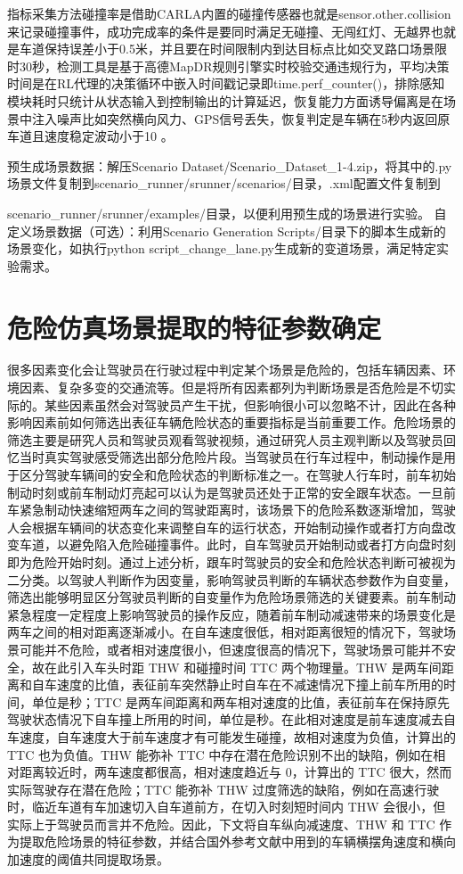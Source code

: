 指标采集方法碰撞率是借助CARLA内置的碰撞传感器也就是sensor.other.collision来记录碰撞事件，成功完成率的条件是要同时满足无碰撞、无闯红灯、无越界也就是车道保持误差小于0.5米，并且要在时间限制内到达目标点比如交叉路口场景限时30秒，检测工具是基于高德MapDR规则引擎实时校验交通违规行为，平均决策时间是在RL代理的决策循环中嵌入时间戳记录即time.perf\_counter()，排除感知模块耗时只统计从状态输入到控制输出的计算延迟，恢复能力方面诱导偏离是在场景中注入噪声比如突然横向风力、GPS信号丢失，恢复判定是车辆在5秒内返回原车道且速度稳定波动小于10 。

预生成场景数据：解压Scenario Dataset/Scenario\_Dataset\_1-4.zip，将其中的.py场景文件复制到scenario\_runner/srunner/scenarios/目录，.xml配置文件复制到

scenario\_runner/srunner/examples/目录，以便利用预生成的场景进行实验。
自定义场景数据（可选）：利用Scenario Generation Scripts/目录下的脚本生成新的场景变化，如执行python script\_change\_lane.py生成新的变道场景，满足特定实验需求。

\section{危险仿真场景提取的特征参数确定}

很多因素变化会让驾驶员在行驶过程中判定某个场景是危险的，包括车辆因素、环境因素、复杂多变的交通流等。但是将所有因素都列为判断场景是否危险是不切实际的。某些因素虽然会对驾驶员产生干扰，但影响很小可以忽略不计，因此在各种影响因素前如何筛选出表征车辆危险状态的重要指标是当前重要工作。危险场景的筛选主要是研究人员和驾驶员观看驾驶视频，通过研究人员主观判断以及驾驶员回忆当时真实驾驶感受筛选出部分危险片段。当驾驶员在行车过程中，制动操作是用于区分驾驶车辆间的安全和危险状态的判断标准之一。在驾驶人行车时，前车初始制动时刻或前车制动灯亮起可以认为是驾驶员还处于正常的安全跟车状态。一旦前车紧急制动快速缩短两车之间的驾驶距离时，该场景下的危险系数逐渐增加，驾驶人会根据车辆间的状态变化来调整自车的运行状态，开始制动操作或者打方向盘改变车道，以避免陷入危险碰撞事件。此时，自车驾驶员开始制动或者打方向盘时刻即为危险开始时刻。通过上述分析，跟车时驾驶员的安全和危险状态判断可被视为二分类。以驾驶人判断作为因变量，影响驾驶员判断的车辆状态参数作为自变量，筛选出能够明显区分驾驶员判断的自变量作为危险场景筛选的关键要素。前车制动紧急程度一定程度上影响驾驶员的操作反应，随着前车制动减速带来的场景变化是两车之间的相对距离逐渐减小。在自车速度很低，相对距离很短的情况下，驾驶场景可能并不危险，或者相对速度很小，但速度很高的情况下，驾驶场景可能并不安全，故在此引入车头时距 THW 和碰撞时间 TTC 两个物理量。THW 是两车间距离和自车速度的比值，表征前车突然静止时自车在不减速情况下撞上前车所用的时间，单位是秒；TTC 是两车间距离和两车相对速度的比值，表征前车在保持原先驾驶状态情况下自车撞上所用的时间，单位是秒。在此相对速度是前车速度减去自车速度，自车速度大于前车速度才有可能发生碰撞，故相对速度为负值，计算出的 TTC 也为负值。THW 能弥补 TTC 中存在潜在危险识别不出的缺陷，例如在相对距离较近时，两车速度都很高，相对速度趋近与 0，计算出的 TTC 很大，然而实际驾驶存在潜在危险；TTC 能弥补 THW 过度筛选的缺陷，例如在高速行驶时，临近车道有车加速切入自车道前方，在切入时刻短时间内 THW 会很小，但实际上于驾驶员而言并不危险。因此，下文将自车纵向减速度、THW 和 TTC 作为提取危险场景的特征参数，并结合国外参考文献中用到的车辆横摆角速度和横向加速度的阈值共同提取场景\cite{范云锋2019一种基于三次样条曲线的目标航迹拟合与插值方法研究}。

